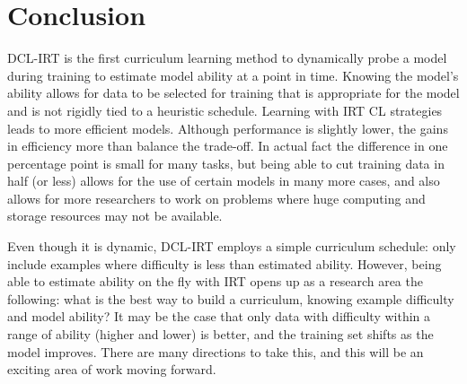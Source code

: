 \documentclass[letterpaper]{article} %
\begin{document}
\section{Conclusion} 

DCL-IRT is the first curriculum learning method to dynamically probe a model during training to estimate model ability at a point in time.
Knowing the model's ability allows for data to be selected for training that is appropriate for the model and is not rigidly tied to a heuristic schedule.
Learning with IRT CL strategies leads to more efficient models.
Although performance is slightly lower, the gains in efficiency more than balance the trade-off.
In actual fact the difference in one percentage point is small for many tasks, but being able to cut training data in half (or less) allows for the use of certain models in many more cases, and also allows for more researchers to work on problems where huge computing and storage resources may not be available.

Even though it is dynamic, DCL-IRT employs a simple curriculum schedule: only include examples where difficulty is less than estimated ability.
However, being able to estimate ability on the fly with IRT opens up as a research area the following: what is the best way to build a curriculum, knowing example difficulty and model ability?
It may be the case that only data with difficulty within a range of ability (higher and lower) is better, and the training set shifts as the model improves.
There are many directions to take this, and this will be an exciting area of work moving forward.
\end{document}
